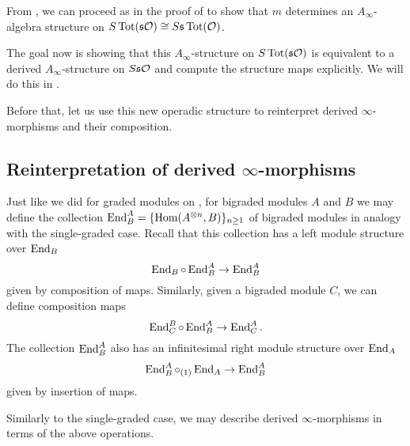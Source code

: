 \documentclass[Thesis.tex]{subfiles}
\begin{document}
From , we can proceed as in the proof of  to show that $m$ determines an $A_\infty$-algebra structure on $S\operatorname{Tot}(\mathfrak{s}{\mathcal O})\cong S\mathfrak{s} \operatorname{Tot}({\mathcal O})$. 

The goal now is showing that this $A_\infty$-structure on $S\operatorname{Tot}(\mathfrak{s}{\mathcal O})$ is equivalent to a derived $A_\infty$-structure on $S\mathfrak{s} {\mathcal O}$ and compute the structure maps explicitly. We will do this in . 

Before that, let us use this new operadic structure to reinterpret derived $\infty$-morphisms and their composition.

\subsection{Reinterpretation of derived $\infty$-morphisms}

Just like we did for graded modules on , for bigraded modules $A$ and $B$ we may define the collection $\operatorname{End}^A_B=\{\operatorname{Hom}(A^{\otimes n}, B)\}_{n\geq 1}$ of bigraded modules in analogy with the single-graded case. Recall that this collection has a left module structure over $\operatorname{End}_B$
\[\operatorname{End}_B\circ \operatorname{End}^A_B\to \operatorname{End}^A_B\]
given by composition of maps. Similarly, given a bigraded module $C$, we can define composition maps
\[\operatorname{End}^B_C\circ \operatorname{End}^A_B\to \operatorname{End}^A_C.\]
The collection $\operatorname{End}^A_B$ also has an infinitesimal right module structure over $\operatorname{End}_A$
\[\operatorname{End}^A_B\circ_{(1)}\operatorname{End}_A\to \operatorname{End}^A_B\]
given by insertion of maps.

Similarly to the single-graded case, we may describe derived $\infty$-morphisms in terms of the above operations.
\end{document}
